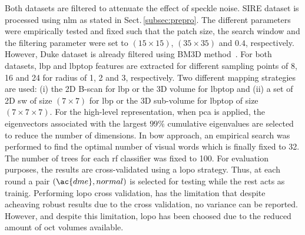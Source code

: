 Both datasets are filtered to attenuate the effect of speckle noise. 
SIRE dataset is processed using \ac{nlm} as stated in Sect.\,\ref{subsec:prepro}.
The different parameters were empirically tested and fixed such that the patch size, the search window and the filtering parameter were set to $(15 \times 15)$, $(35 \times 35)$ and $0.4$, respectively.
However, Duke dataset is already filtered using BM3D method~\cite{Srinivasan2014}.
For both datasets, \ac{lbp} and \ac{lbptop} features are extracted for different sampling points of 8, 16 and 24 for radius of 1, 2 and 3, respectively.
Two different mapping strategies are used: (i) the 2D B-scan for \ac{lbp} or the 3D volume for \ac{lbptop} and (ii) a set of 2D \ac{sw} of size $(7 \times 7)$ for \ac{lbp} or the 3D sub-volume for \ac{lbptop} of size $(7 \times 7 \times 7)$.
For the high-level representation, when \ac{pca} is applied, the eigenvectors associated with the largest $99\%$ cumulative eigenvalues are selected to reduce the number of dimensions. In \ac{bow} approach, an empirical search was performed to find the optimal number of visual words which is finally fixed to 32. 
The number of trees for each \ac{rf} classifier was fixed to 100.
For evaluation purposes, the results are cross-validated using a \ac{lopo} strategy. Thus, at each round a pair $(\ac{dme}, normal)$ is selected for testing while the rest acts as trainig.
Performing \ac{lopo} cross validation, has the limitation that despite acheaving robust results due to the cross validation, no variance can be reported.
However, and despite this limitation, \ac{lopo} has been choosed due to the reduced amount of \ac{oct} volumes available.

